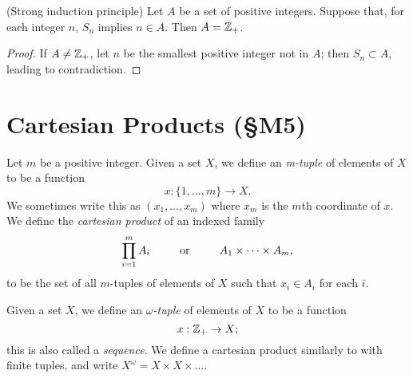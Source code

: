 \documentclass{report}
\begin{document}
\begin{theorem}
  {\normalfont (Strong induction principle)} Let $A$ be a set of positive integers. Suppose that, for each integer $n$, $S_n$ implies $n \in A$. Then $A = \mathbb{Z}_+$.
\end{theorem}
\begin{proof}  
If $A \neq \mathbb{Z}_+$, let $n$ be the smallest positive integer not in $A$; then $S_n \subset A$, leading to contradiction.
\end{proof}

\section{Cartesian Products (\S M5)}
\begin{definition}
  Let $m$ be a positive integer.
  Given a set $X$, we define an \emph{m-tuple} of elements of $X$ to be a function
  \[
    x : \{1,\dots,m\} \rightarrow X.
  \]
  We sometimes write this as $(x_1,\dots,x_m)$ where $x_m$ is the $m$th coordinate of $x$.
  We define the \emph{cartesian product} of an indexed family
  \[
    \prod_{i=1}^m A_i \text { \hspace{20pt} or \hspace{20pt} } A_1 \times \dots \times A_m,
  \]
  to be the set of all $m$-tuples of elements of $X$ such that $x_i \in A_i$ for each $i$.
\end{definition}
\begin{definition}
  Given a set $X$, we define an \emph{$\omega$-tuple} of elements of $X$ to be a function
  \[
     x : \mathbb{Z}_+ \rightarrow X;
  \]
  this is also called a \emph{sequence}.
  We define a cartesian product similarly to with finite tuples, and write $X^\omega = X \times X \times \dots$.
\end{definition}
\end{document}
